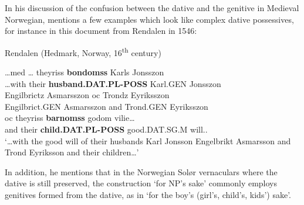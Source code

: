 
In his discussion of the confusion between the dative and the genitive in Medieval Norwegian, \citet{Larsen1895} mentions a few examples which look like complex dative possessives, for instance in this document from Rendalen in 1546:


\item 

Rendalen (Hedmark, Norway, 16\textsuperscript{th} century)



 \ea\label{}
\gll …med  …  theyriss  \textbf{bondomss} Karls  Jonsszon\\


…with    their  \textbf{husband.DAT.PL-POSS} Karl.GEN  Jonsszon\\

 \ea\label{}
\gll Engilbrictz  Asmarsszon  oc  Trondz  Eyriksszon\\


Engilbrict.GEN  Asmarsszon  and  Trond.GEN   Eyriksszon\\

 \ea\label{}
\gll oc  theyriss  \textbf{barnomss}  godom  vilie…\\


and  their  \textbf{child.DAT.PL-POSS} good.DAT.SG.M  will..\\

\glt ‘…with the good will of their husbands Karl Jonsson Engelbrikt Asmarsson and Trond Eyriksson and their children…’

\z

In addition, he mentions that in the Norwegian Solør vernaculars where the dative is still preserved, the construction ‘for NP’s sake’ commonly employs genitives formed from the dative, as in  ‘for the boy’s (girl’s, child’s, kids’) sake’. 

